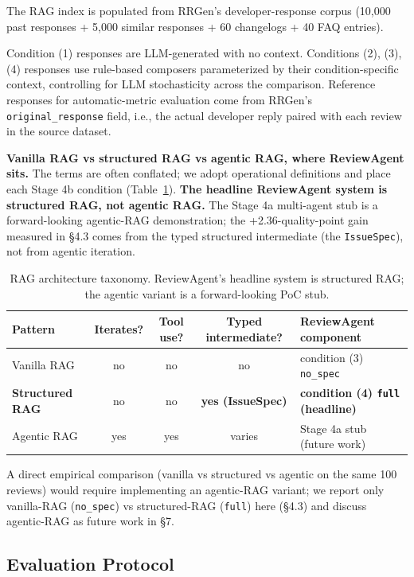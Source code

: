\documentclass[sigconf, nonacm, anonymous, balance=false]{acmart}
\begin{document}
The RAG index is populated from RRGen's developer-response corpus (10,000 past responses + 5,000 similar responses + 60 changelogs + 40 FAQ entries).

Condition (1) responses are LLM-generated with no context. Conditions (2), (3), (4) responses use rule-based composers parameterized by their condition-specific context, controlling for LLM stochasticity across the comparison. Reference responses for automatic-metric evaluation come from RRGen's \texttt{original\_response} field, i.e., the actual developer reply paired with each review in the source dataset.

\textbf{Vanilla RAG vs structured RAG vs agentic RAG, where ReviewAgent sits.} The terms are often conflated; we adopt operational definitions and place each Stage 4b condition (Table~\ref{tab:rag-arch}). \textbf{The headline ReviewAgent system is structured RAG, not agentic RAG.} The Stage 4a multi-agent stub is a forward-looking agentic-RAG demonstration; the +2.36-quality-point gain measured in \S4.3 comes from the typed structured intermediate (the \texttt{IssueSpec}), not from agentic iteration.

\begin{table}[t]\centering\footnotesize\setlength{\tabcolsep}{2pt}
\caption{RAG architecture taxonomy. ReviewAgent's headline system is structured RAG; the agentic variant is a forward-looking PoC stub.}\label{tab:rag-arch}
\begin{tabular}{p{2cm}cccp{2.6cm}}\toprule
Pattern & Iterates? & Tool use? & Typed intermediate? & ReviewAgent component \\\midrule
Vanilla RAG \cite{lewis2020rag} & no & no & no & condition (3) \texttt{no\_spec} \\
\textbf{Structured RAG} & no & no & \textbf{yes (IssueSpec)} & \textbf{condition (4) \texttt{full} (headline)} \\
Agentic RAG \cite{asai2024selfrag, khattab2022demonstrate} & yes & yes & varies & Stage 4a stub (future work) \\\bottomrule
\end{tabular}\end{table}

A direct empirical comparison (vanilla vs structured vs agentic on the same 100 reviews) would require implementing an agentic-RAG variant; we report only vanilla-RAG (\texttt{no\_spec}) vs structured-RAG (\texttt{full}) here (\S4.3) and discuss agentic-RAG as future work in \S7.

\subsection{Evaluation Protocol}\label{evaluation-protocol}
\end{document}
